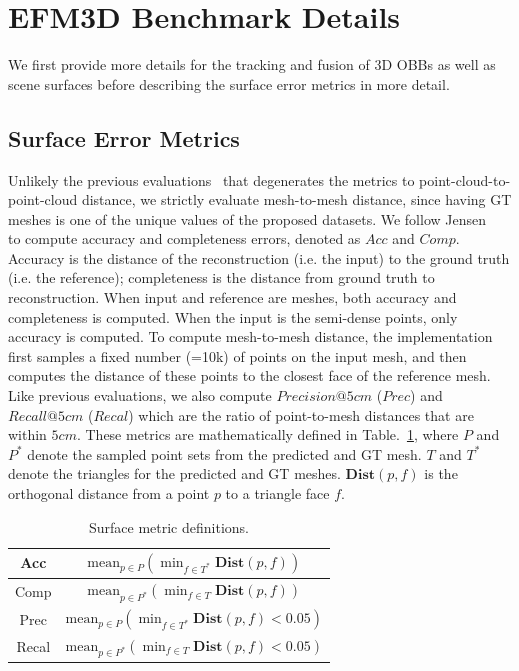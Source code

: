 \section{EFM3D Benchmark Details}

We first provide more details for the tracking and fusion of 3D OBBs as well as scene surfaces before describing the surface error metrics in more detail.



\subsection{Surface Error Metrics}
Unlikely the previous evaluations~\cite{sun2021neucon,murez2020atlas} that degenerates the metrics to point-cloud-to-point-cloud distance, we strictly evaluate mesh-to-mesh distance, since having GT meshes is one of the unique values of the proposed datasets. We follow Jensen \etal~\cite{jensen2014large} to compute accuracy and completeness errors, denoted as $Acc$ and $Comp$. Accuracy is the distance of the reconstruction (i.e. the input) to the ground truth (i.e. the reference); completeness is the distance from ground truth to reconstruction. When input and reference are meshes, both accuracy and completeness is computed. When the input is the semi-dense points, only accuracy is computed. 
To compute mesh-to-mesh distance, the implementation first samples a fixed number (=10k) of points on the input mesh, and then computes the distance of these points to the closest face of the reference mesh.
Like previous evaluations, we also compute $Precision@5cm$ ($Prec$) and $Recall@5cm$ ($Recal$) which are the ratio of point-to-mesh distances that are within $5cm$. These metrics are mathematically defined in Table.~\ref{tab:surf_metrics}, where $P$ and $P^{*}$ denote the sampled point sets from the predicted and GT mesh. $T$ and $T^{*}$ denote the triangles for the predicted and GT meshes. $\textbf{Dist}(p, f)$ is the orthogonal distance from a point $p$ to a triangle face $f$.  
\begin{table}[]
    \centering
    \begin{tabular}{c|c}
       \hline \hline
       Acc  &   $\text{mean}_{p\in P} (\min_{f \in T^{*}} \textbf{Dist}(p, f) )$ \\ \hline 
       Comp     &  $\text{mean}_{p\in P^{*}} (\min_{f \in T} \textbf{Dist}(p, f) )$  \\ \hline           
       Prec     &     $\text{mean}_{p\in P} (\min_{f \in T^{*}} \textbf{Dist}(p, f) < 0.05 )$        \\ \hline
       Recal     &      $\text{mean}_{p\in P^{*}} (\min_{f \in T} \textbf{Dist}(p, f) < 0.05)$         \\
       \hline \hline
    \end{tabular}
    \caption{Surface metric definitions.}
    \label{tab:surf_metrics}
\end{table}


